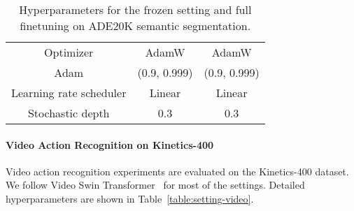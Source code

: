 \documentclass{article}
\begin{document}
\begin{table}[h]
\begin{tabular}{c|cc|cc}
    Optimizer & \multicolumn{2}{c|}{AdamW} & \multicolumn{2}{c}{AdamW} \\
    Adam  & \multicolumn{2}{c|}{(0.9, 0.999)} & \multicolumn{2}{c}{(0.9, 0.999)} \\
    Learning rate scheduler & \multicolumn{2}{c|}{Linear} & \multicolumn{2}{c}{Linear} \\
    Stochastic depth & \multicolumn{2}{c|}{0.3} & \multicolumn{2}{c}{0.3} \\
    \bottomrule
    \end{tabular}
    \vspace{0.5em}
    \caption{Hyperparameters for the frozen setting and full finetuning on ADE20K semantic segmentation.}
    \label{table:setting-ade}
\end{table}

\paragraph{Video Action Recognition on Kinetics-400}

Video action recognition experiments are evaluated on the Kinetics-400 dataset. We follow Video Swin Transformer~\cite{liu2021video} for most of the settings. Detailed hyperparameters are shown in Table~\ref{table:setting-video}.
\end{document}
